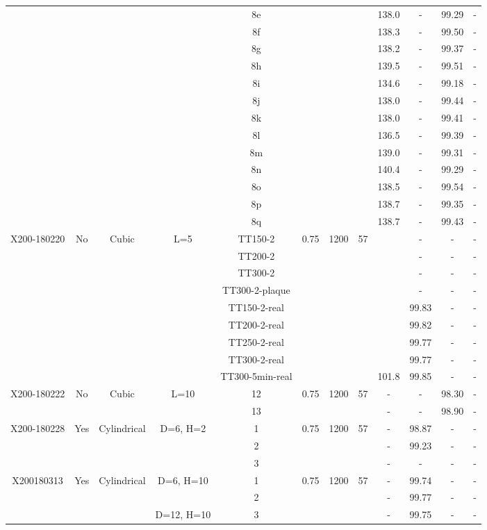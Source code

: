 \begin{center}
\begin{landscape}
\begin{savenotes}
\begin{longtable}{@{\extracolsep{\fill}}*{12}{|c}|@{}}
  & & & & 8e & & & &138.0 &- &99.29 &-\\
  & & & & 8f & & & &138.3 & -&99.50 &-\\
  & & & & 8g & & & &138.2 & -&99.37 &-\\
  & & & & 8h & & & &139.5 & -&99.51 &-\\
  & & & & 8i & & & &134.6 &- &99.18 &-\\
  & & & & 8j & & & &138.0 & -&99.44 &-\\
  & & & & 8k & & & &138.0 &- &99.41 &-\\  
  & & & & 8l & & & &136.5 & -&99.39 &-\\
  & & & & 8m & & & &139.0 & -&99.31 &-\\
  & & & & 8n & & & &140.4 &- &99.29 &-\\
  & & & & 8o & & & &138.5 &- &99.54 &-\\     
  & & & & 8p & & & &138.7 & -&99.35 &-\\
  & & & & 8q & & & &138.7 & -&99.43 &-\\        
\hline  
  X200-180220 & No & Cubic & L=5 & TT150-2 & 0.75 & 1200 & 57 & & -  & -&-\\
  & &  & & TT200-2 &  & & & &- & -&-\\
  & &  & & TT300-2 &  & & & &- &- &-\\
  & &  & & TT300-2-plaque &  & & & &- &- &-\\
  & &  & & TT150-2-real &  & & & & 99.83&- &-\\
  & &  & & TT200-2-real &  & & & &99.82 &- &-\\
  & &  & & TT250-2-real &  & & & &99.77 &- &-\\
  & &  & & TT300-2-real &  & & & &99.77 & - &-\\
    & &  & & TT300-5min-real &  & & &101.8 &99.85 & -&-\\  
\hline  
  X200-180222 & No & Cubic & L=10 &12& 0.75 & 1200 & 57 & - &- &98.30 &-\\
  & &  & &13 &  & & &- &- &98.90 &-\\
\hline  
  X200-180228  & Yes & Cylindrical & D=6, H=2 &1 & 0.75 & 1200 &57 &- &98.87 &- &-\\
  & &  &  & 2&  & & &- &99.23 &- &-\\
  & &  &  & 3 &  & & &- &- &- &-\\
\hline  
  X200180313 & Yes & Cylindrical & D=6, H=10&1& 0.75 & 1200 &57 &- &99.74 &- &-\\
    & &    & &2 & & & &- &99.77 &- &- \\
    & &  &D=12, H=10 &3& & & &- &99.75 & -& -\\

\end{longtable}
\end{savenotes}
\end{landscape}
\end{center}
